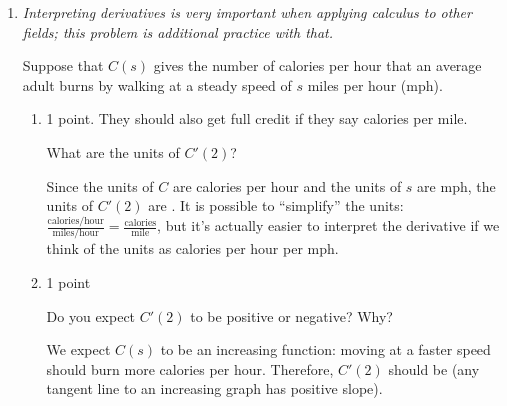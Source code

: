 \documentclass{article}
\begin{document}
\begin{enumerate}
\begin{enumerate}
  \end{enumerate}

\item \label{gottlieb-5.4.10}


  \emph{Interpreting derivatives is very important when applying calculus to other fields; this problem is additional practice with that.}

  Suppose that $C(s)$ gives the number of calories per hour that an average adult burns by walking at a steady speed of $s$ miles per hour (mph).
  \begin{enumerate}
  \item
    \begin{grading}
      1 point. They should also get full credit if they say calories per mile. 
    \end{grading}

    \begin{problem}[0.2in]
      What are the units of $C'(2)$?
    \end{problem}

    \begin{solution} %
      Since the units of $C$ are calories per hour and the units of $s$ are mph, the units of $C'(2)$ are . It is possible to ``simplify'' the units: $\displaystyle \frac{\text{calories} / \text{hour}}{\text{miles} / \text{hour}} = \frac{\text{calories}}{\text{mile}}$, but it's actually easier to interpret the derivative if we think of the units as calories per hour per mph.
    \end{solution}

  \item

    \begin{grading}
      1 point
    \end{grading}

    \begin{problem}[\vfill]
      Do you expect $C'(2)$ to be positive or negative? Why?
    \end{problem}

    \begin{solution} 
      We expect $C(s)$ to be an increasing function: moving at a faster speed should burn more calories per hour. Therefore, $C'(2)$ should be  (any tangent line to an increasing graph has positive slope).
    \end{solution}


\end{enumerate}
\end{enumerate}
\end{document}
